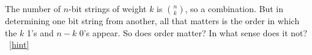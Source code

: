 \documentclass{book}
\begin{document}
\setcounter{project}{117}
\addtocounter{project}{-1}
\begin{activity}[]\label{activity-110}
\hypertarget{p-841}{}%
The number of \(n\)-bit strings of weight \(k\) is \(\binom{n}{k}\), so a combination.  But in determining one bit string from another, all that matters is the order in which the \(k\) 1's and \(n-k\) 0's appear.  So does order matter?  In what sense does it not?%
~\hfill{\tiny\hyperlink{a-117}{[hint]}\hypertarget{q-117}{}}\end{activity}
\end{document}
